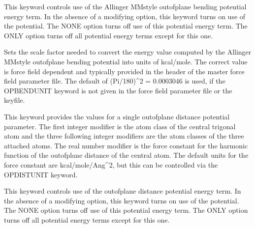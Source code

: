 \documentclass[letterpaper,11pt,english]{sphinxmanual}
\begin{document}




  This keyword controls use of the Allinger MM\sphinxhyphen{}style out\sphinxhyphen{}of\sphinxhyphen{}plane bending potential energy term. In the absence of a modifying option, this keyword turns on use of the potential. The NONE option turns off use of this potential energy term. The ONLY option turns off all potential energy terms except for this one.


  Sets the scale factor needed to convert the energy value computed by the Allinger MM\sphinxhyphen{}style out\sphinxhyphen{}of\sphinxhyphen{}plane bending potential into units of kcal/mole. The correct value is force field dependent and typically provided in the header of the master force field parameter file. The default of (Pi/180)\textasciicircum{}2 = 0.0003046 is used, if the OPBENDUNIT keyword is not given in the force field parameter file or the keyfile.

  This keyword provides the values for a single out\sphinxhyphen{}of\sphinxhyphen{}plane distance potential parameter. The first integer modifier is the atom class of the central trigonal atom and the three following integer modifiers are the atom classes of the three attached atoms. The real number modifier is the force constant for the harmonic function of the out\sphinxhyphen{}of\sphinxhyphen{}plane distance of the central atom. The default units for the force constant are kcal/mole/Ang\textasciicircum{}2, but this can be controlled via the OPDISTUNIT keyword.





  This keyword controls use of the out\sphinxhyphen{}of\sphinxhyphen{}plane distance potential energy term. In the absence of a modifying option, this keyword turns on use of the potential. The NONE option turns off use of this potential energy term. The ONLY option turns off all potential energy terms except for this one.
\end{document}
